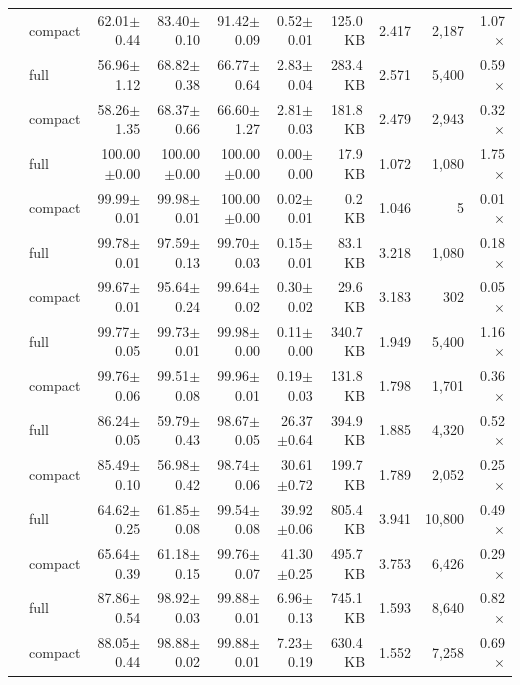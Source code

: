 \begin{table}[!t]
\begin{tabular}{llrrrrrrrr}
 & compact & 62.01$\pm$0.44 & 83.40$\pm$0.10 & 91.42$\pm$0.09 & 0.52$\pm$0.01 & 125.0\,KB & 2.417 & 2,187 & 1.07$\times$ \\
\addlinespace
\multirow{2}{*}{NSL-KDD} & full & 56.96$\pm$1.12 & 68.82$\pm$0.38 & 66.77$\pm$0.64 & 2.83$\pm$0.04 & 283.4\,KB & 2.571 & 5,400 & 0.59$\times$ \\
 & compact & 58.26$\pm$1.35 & 68.37$\pm$0.66 & 66.60$\pm$1.27 & 2.81$\pm$0.03 & 181.8\,KB & 2.479 & 2,943 & 0.32$\times$ \\
\addlinespace
\multirow{2}{*}{CTU-13} & full & 100.00$\pm$0.00 & 100.00$\pm$0.00 & 100.00$\pm$0.00 & 0.00$\pm$0.00 & 17.9\,KB & 1.072 & 1,080 & 1.75$\times$ \\
 & compact & 99.99$\pm$0.01 & 99.98$\pm$0.01 & 100.00$\pm$0.00 & 0.02$\pm$0.01 & 0.2\,KB & 1.046 & 5 & 0.01$\times$ \\
\addlinespace
\multirow{2}{*}{ISCXIDS2012} & full & 99.78$\pm$0.01 & 97.59$\pm$0.13 & 99.70$\pm$0.03 & 0.15$\pm$0.01 & 83.1\,KB & 3.218 & 1,080 & 0.18$\times$ \\
 & compact & 99.67$\pm$0.01 & 95.64$\pm$0.24 & 99.64$\pm$0.02 & 0.30$\pm$0.02 & 29.6\,KB & 3.183 & 302 & 0.05$\times$ \\
\addlinespace
\multirow{2}{*}{CIC-IDS2017} & full & 99.77$\pm$0.05 & 99.73$\pm$0.01 & 99.98$\pm$0.00 & 0.11$\pm$0.00 & 340.7\,KB & 1.949 & 5,400 & 1.16$\times$ \\
 & compact & 99.76$\pm$0.06 & 99.51$\pm$0.08 & 99.96$\pm$0.01 & 0.19$\pm$0.03 & 131.8\,KB & 1.798 & 1,701 & 0.36$\times$ \\
\addlinespace
\multirow{2}{*}{CSE-CIC-IDS2018} & full & 86.24$\pm$0.05 & 59.79$\pm$0.43 & 98.67$\pm$0.05 & 26.37$\pm$0.64 & 394.9\,KB & 1.885 & 4,320 & 0.52$\times$ \\
 & compact & 85.49$\pm$0.10 & 56.98$\pm$0.42 & 98.74$\pm$0.06 & 30.61$\pm$0.72 & 199.7\,KB & 1.789 & 2,052 & 0.25$\times$ \\
\addlinespace
\multirow{2}{*}{UNSW-NB15} & full & 64.62$\pm$0.25 & 61.85$\pm$0.08 & 99.54$\pm$0.08 & 39.92$\pm$0.06 & 805.4\,KB & 3.941 & 10,800 & 0.49$\times$ \\
 & compact & 65.64$\pm$0.39 & 61.18$\pm$0.15 & 99.76$\pm$0.07 & 41.30$\pm$0.25 & 495.7\,KB & 3.753 & 6,426 & 0.29$\times$ \\
\addlinespace
\multirow{2}{*}{CICIoT2023} & full & 87.86$\pm$0.54 & 98.92$\pm$0.03 & 99.88$\pm$0.01 & 6.96$\pm$0.13 & 745.1\,KB & 1.593 & 8,640 & 0.82$\times$ \\
 & compact & 88.05$\pm$0.44 & 98.88$\pm$0.02 & 99.88$\pm$0.01 & 7.23$\pm$0.19 & 630.4\,KB & 1.552 & 7,258 & 0.69$\times$ \\

\end{tabular}
\end{table}
